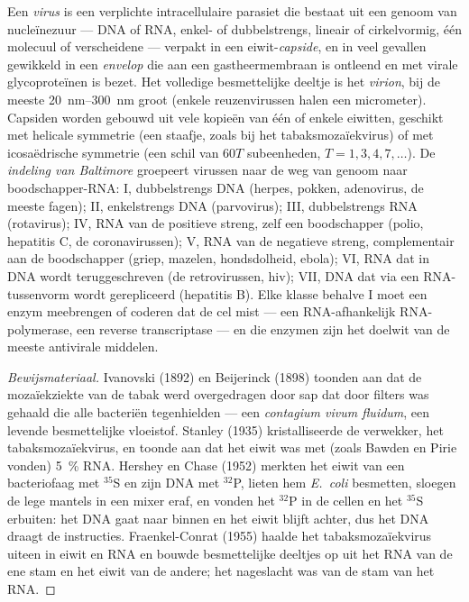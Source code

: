\begin{definition}[Virus]\label{def:b3:virology:virus}
Een \emph{virus} is een verplichte intracellulaire parasiet die bestaat
uit een genoom van nucleïnezuur --- DNA of RNA, enkel- of
dubbelstrengs, lineair of cirkelvormig, één molecuul of verscheidene
--- verpakt in een eiwit-\emph{capside}, en in veel gevallen gewikkeld
in een \emph{envelop} die aan een gastheermembraan is ontleend en met
virale glycoproteïnen is bezet. Het volledige besmettelijke deeltje is
het \emph{virion}, bij de meeste \qtyrange{20}{300}{nm} groot (enkele
reuzenvirussen halen een micrometer). Capsiden worden gebouwd uit vele
kopieën van één of enkele eiwitten, geschikt met helicale symmetrie
(een staafje, zoals bij het tabaksmozaïekvirus) of met icosaëdrische
symmetrie (een schil van $60T$ subeenheden, $T = 1, 3, 4, 7,\dots$). De
\emph{indeling van Baltimore} groepeert virussen naar de weg van genoom
naar boodschapper-RNA: I, dubbelstrengs DNA (herpes, pokken,
adenovirus, de meeste fagen); II, enkelstrengs DNA (parvovirus); III,
dubbelstrengs RNA (rotavirus); IV, RNA van de positieve streng, zelf
een boodschapper (polio, hepatitis C, de coronavirussen); V, RNA van de
negatieve streng, complementair aan de boodschapper (griep, mazelen,
hondsdolheid, ebola); VI, RNA dat in DNA wordt teruggeschreven (de
retrovirussen, hiv); VII, DNA dat via een RNA-tussenvorm wordt
gerepliceerd (hepatitis B). Elke klasse behalve I moet een enzym
meebrengen of coderen dat de cel mist --- een RNA-afhankelijk
RNA-polymerase, een reverse transcriptase --- en die enzymen zijn het
doelwit van de meeste antivirale middelen.
\end{definition}

\begin{proof}[Bewijsmateriaal]
Ivanovski (1892) en Beijerinck (1898) toonden aan dat de mozaïekziekte
van de tabak werd overgedragen door sap dat door filters was gehaald
die alle bacteriën tegenhielden --- een \emph{contagium vivum fluidum},
een levende besmettelijke vloeistof. Stanley (1935) kristalliseerde de
verwekker, het tabaksmozaïekvirus, en toonde aan dat het eiwit was met
(zoals Bawden en Pirie vonden) \qty{5}{\%} RNA. Hershey en Chase (1952)
merkten het eiwit van een bacteriofaag met $^{35}$S en zijn DNA met
$^{32}$P, lieten hem \emph{E.~coli} besmetten, sloegen de lege mantels
in een mixer eraf, en vonden het $^{32}$P in de cellen en het $^{35}$S
erbuiten: het DNA gaat naar binnen en het eiwit blijft achter, dus het
DNA draagt de instructies. Fraenkel-Conrat (1955) haalde het
tabaksmozaïekvirus uiteen in eiwit en RNA en bouwde besmettelijke
deeltjes op uit het RNA van de ene stam en het eiwit van de andere; het
nageslacht was van de stam van het RNA.
\end{proof}

